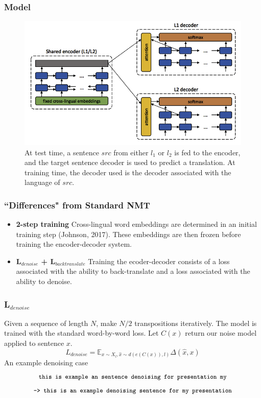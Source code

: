 \documentclass{beamer}
\begin{document}
\begin{frame}
\frametitle{Model}
 \begin{figure}
  \centering
  \includegraphics[width=.8\textwidth]{pres_imgs/unsupmodel}
  \caption{\label{fig:unsupmodel} At test time, a sentence $src$ from either $l_1$ or $l_2$ is fed to the encoder, and the target sentence decoder is used to predict a translation. At training time, the decoder used is the decoder associated with the language of $src$.}
\end{figure}

\end{frame}

\begin{frame}
\frametitle{``Differences" from Standard NMT}
\begin{itemize}
\item \textbf{2-step training} Cross-lingual word embeddings are determined in an initial training step (Johnson, 2017). These embeddings are then frozen before training the encoder-decoder system. 
\item \textbf{L$_{denoise}$ + L$_{backtranslate}$} Training the ecoder-decoder consists of a loss associated with the ability to back-translate and a loss associated with the ability to denoise.
\end{itemize}
\end{frame}

\begin{frame}
\frametitle{L$_{denoise}$}
Given a sequence of length $N$, make $N/2$ transpositions iteratively. The model is trained with the standard word-by-word loss. Let $C(x)$ return our noise model applied to sentence $x$.
$$ L_{denoise} = \mathbb{E}_{x\sim X_l, \hat{x}\sim d(e(C(x)),l)}\Delta(\hat{x},x) $$
An example denoising case
$$\texttt{\small this is example an sentence denoising for presentation my}$$
$$\texttt{\small -> this is an example denoising sentence for my presentation}$$
\end{frame}
\end{document}
